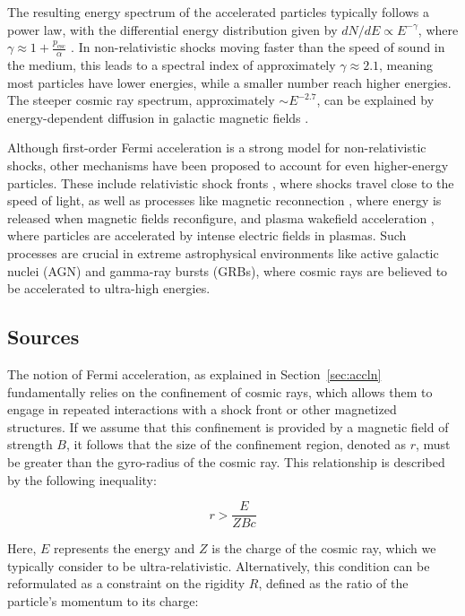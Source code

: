 The resulting energy spectrum of the accelerated particles typically follows a power law, with the differential energy distribution given by $dN/dE \propto E^{-\gamma}$, where $\gamma \approx 1 + \frac{p_{\text{esc}}}{\alpha}$ . In non-relativistic shocks moving faster than the speed of sound in the medium, this leads to a spectral index of approximately $\gamma \approx 2.1$, meaning most particles have lower energies, while a smaller number reach higher energies. The steeper cosmic ray spectrum, approximately $\sim E^{-2.7}$, can be explained by energy-dependent diffusion in galactic magnetic fields .

Although first-order Fermi acceleration is a strong model for non-relativistic shocks, other mechanisms have been proposed to account for even higher-energy particles. These include relativistic shock fronts , where shocks travel close to the speed of light, as well as processes like magnetic reconnection , where energy is released when magnetic fields reconfigure, and plasma wakefield acceleration , where particles are accelerated by intense electric fields in plasmas. Such processes are crucial in extreme astrophysical environments like active galactic nuclei (AGN) and gamma-ray bursts (GRBs), where cosmic rays are believed to be accelerated to ultra-high energies.

\subsection{Sources}
\label{sec:cosmic_sources}
The notion of Fermi acceleration, as explained in Section~\ref{sec:accln} fundamentally relies on the confinement of cosmic rays, which allows them to engage in repeated interactions with a shock front or other magnetized structures. If we assume that this confinement is provided by a magnetic field of strength \(B\), it follows that the size of the confinement region, denoted as \(r\), must be greater than the gyro-radius of the cosmic ray. This relationship is described by the following inequality:

\begin{equation}
    r > \frac{E}{ZBc}
\end{equation}

Here, \(E\) represents the energy and \(Z\) is the charge of the cosmic ray, which we typically consider to be ultra-relativistic. Alternatively, this condition can be reformulated as a constraint on the rigidity \(R\), defined as the ratio of the particle's momentum to its charge:

